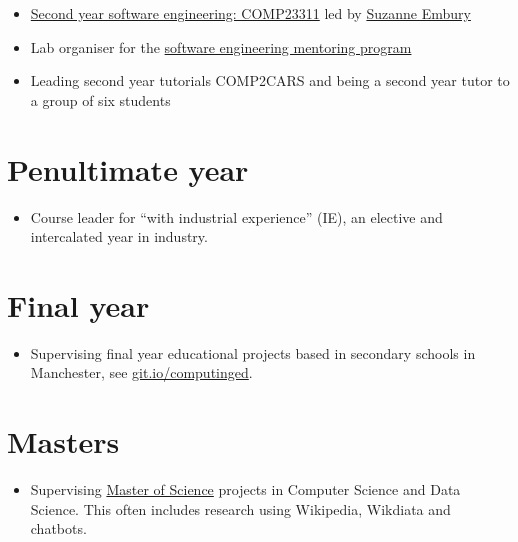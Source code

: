 \documentclass[12pt,]{book}
\providecommand{\tightlist}{%
  \setlength{\itemsep}{0pt}\setlength{\parskip}{0pt}}
\begin{document}
\begin{itemize}
\tightlist
\item
  \href{https://studentnet.cs.manchester.ac.uk/ugt/COMP23311/syllabus/}{Second year software engineering: COMP23311} led by \href{http://www.cs.man.ac.uk/~embury/}{Suzanne Embury}
\item
  Lab organiser for the \href{https://www.cs.manchester.ac.uk/connect/business-engagement/industrial-mentoring/}{software engineering mentoring program}
\item
  Leading second year tutorials COMP2CARS and being a second year tutor to a group of six students
\end{itemize}

\hypertarget{penultimate-year}{%
\section{Penultimate year}\label{penultimate-year}}

\begin{itemize}
\tightlist
\item
  Course leader for ``with industrial experience'' (IE), an elective and intercalated year in industry.
\end{itemize}

\hypertarget{final-year}{%
\section{Final year}\label{final-year}}

\begin{itemize}
\tightlist
\item
  Supervising final year educational projects based in secondary schools in Manchester, see \href{https://git.io/computinged}{git.io/computinged}.
\end{itemize}

\hypertarget{masters}{%
\section{Masters}\label{masters}}

\begin{itemize}
\tightlist
\item
  Supervising \href{https://www.cs.manchester.ac.uk/study/masters/}{Master of Science} projects in Computer Science and Data Science. This often includes research using Wikipedia, Wikdiata and chatbots. 🤖
\end{itemize}
\end{document}

